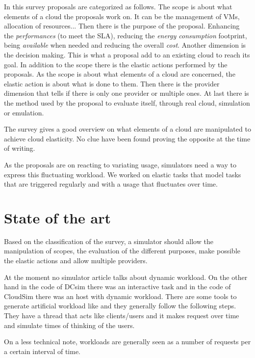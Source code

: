 \documentclass[a4paper]{IEEEtran}
\begin{document}
  In this survey proposals are categorized as follows. The scope is about what
  elements of a cloud the proposals work on. It can be the management of VMs,
  allocation of resources... Then there is the purpose of the proposal.
  Enhancing the \textit{performances} (to meet the SLA), reducing the
  \textit{energy consumption} footprint, being \textit{available} when needed
  and reducing the overall \textit{cost}. Another dimension is the decision
  making. This is what a proposal add to an existing cloud to reach its goal. In
  addition to the scope there is the elastic actions performed by the proposals.
  As the scope is about what elements of a cloud are concerned, the elastic
  action is about what is done to them. Then there is the provider dimension
  that tells if there is only one provider or multiple ones. At last there is
  the method used by the proposal to evaluate itself, through real cloud,
  simulation or emulation.
  
  The survey gives a good overview on what elements of a cloud are manipulated
  to achieve cloud elasticity. No clue have been found proving the opposite at
  the time of writing.
  
  As the proposals are on reacting to variating usage, simulators need a way to
  express this fluctuating workload. We worked on elastic tasks that model tasks
  that are triggered regularly and with a usage that fluctuates over time.


\section{State of the art} \label{sota}
  Based on the classification of the survey, a simulator should allow the
  manipulation of scopes, the evaluation of the different purposes, make
  possible the elastic actions and allow multiple providers.
  
  At the moment no simulator article talks about dynamic workload. On the other
  hand in the code of DCsim \cite{tighe2013towards} there was an interactive
  task and in the code of CloudSim \cite{calheiros2011cloudsim} there was an
  host with dynamic workload. There are some tools to generate artificial
  workload like \cite{bodik2010characterizing} and they generally follow the
  following steps. They have a thread that acts like clients/users and it makes
  request over time and simulate times of thinking of the users.
  
  On a less technical note, workloads are generally seen as a number of 
  requests per a certain interval of time.
  
\end{document}
